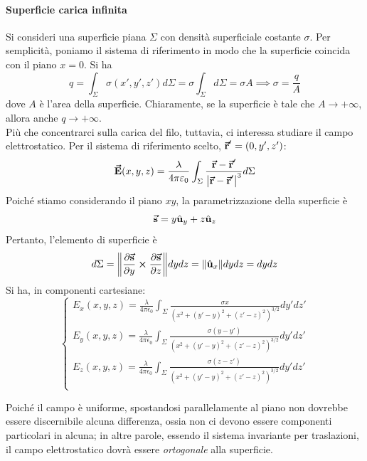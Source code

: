 \paragraph{Superficie carica infinita}%
	Si consideri una superficie piana $\Sigma$ con densità superficiale costante $\sigma$. Per semplicità, poniamo il sistema di riferimento in modo che la superficie coincida con il piano $x=0$. Si ha
	\begin{equation*}
		q=\int_{\Sigma}\sigma(x',y',z')d\Sigma=\sigma\int_{\Sigma}d\Sigma=\sigma A\implies \sigma=\frac{q}{A}
	\end{equation*}
	dove $A$ è l'area della superficie. Chiaramente, se la superficie è tale che $A\to+\infty$, allora anche $q\to+\infty$.\\
	Più che concentrarci sulla carica del filo, tuttavia, ci interessa studiare il campo elettrostatico. Per il sistema di riferimento scelto, $\vb*{\va{r}}'=\left(0,y',z'\right)$:
	\begin{equation}
		\vb*{\va{E}}(x,y,z)=\frac{\lambda}{4\pi\varepsilon_0}\int_{\Sigma}\frac{\vb*{\va{r}}-\vb*{\va{r}}'}{\abs{\vb*{\va{r}}-\vb*{\va{r}}'}^3}d\Sigma
	\end{equation}
	Poiché stiamo considerando il piano $xy$, la parametrizzazione della superficie è
	\begin{equation}
		\vb*{\va{s}}=y\hat{\mathbf{u}}_y+z\hat{\mathbf{u}}_z
	\end{equation}
	Pertanto, l'elemento di superficie è
	\begin{equation*}
		d\Sigma=\norm{\pdv{\vb*{\va{s}}}{y}\cross\pdv{\vb*{\va{s}}}{z}}dydz=\norm{\hat{\mathbf{u}}_x}dydz=dydz
	\end{equation*}
	Si ha, in componenti cartesiane:
	\begin{equation*}
		\begin{cases}
			E_x(x,y,z)=\frac{\lambda}{4\pi\epsilon_0}\int_{\Sigma}\frac{\sigma x}{\left(x^2+(y'-y)^2+(z'-z)^2\right)^{3/2}}dy'dz'\\
			E_y(x,y,z)=\frac{\lambda}{4\pi\epsilon_0}\int_{\Sigma}\frac{\sigma (y-y')}{\left(x^2+(y'-y)^2+(z'-z)^2\right)^{3/2}}dy'dz'\\
			E_z(x,y,z)=\frac{\lambda}{4\pi\epsilon_0}\int_{\Sigma}\frac{\sigma (z-z')}{\left(x^2+(y'-y)^2+(z'-z)^2\right)^{3/2}}dy'dz'\\
		\end{cases}
	\end{equation*}
\begin{observe}
	Poiché il campo è uniforme, spostandosi parallelamente al piano non dovrebbe essere discernibile alcuna differenza, ossia non ci devono essere componenti particolari in alcuna; in altre parole, essendo il sistema invariante per traslazioni, il campo elettrostatico dovrà essere \textit{ortogonale} alla superficie.
\end{observe}
